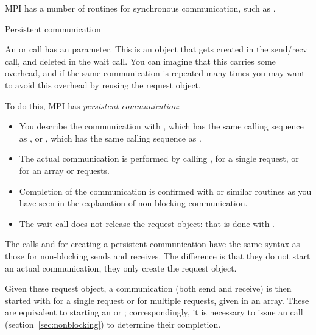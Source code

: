 MPI has a number of routines for synchronous communication,
such as .



 {Persistent communication}
\label{sec:persistent}

An  or  call has an
 parameter.  This is an object that gets
created in the send/recv call, and deleted in the wait call. You can
imagine that this carries some overhead, and if the same communication
is repeated many times you may want to avoid this overhead by reusing
the request object.

To do this, MPI has \emph{persistent communication}:
\begin{itemize}
\item You describe the communication with
  , which has the same calling sequence as
  , or , which has the same
  calling sequence as .
\item The actual communication is performed by calling
  , for a single request, or
   for an array or requests.
\item Completion of the communication is confirmed with
   or similar routines as you have seen in the
  explanation of non-blocking communication.
\item The wait call does not release the request object: that is done
  with .
\end{itemize}

The calls  and 
for creating a persistent communication have the same syntax as 
those for non-blocking sends and receives. The difference is that they do not start
an actual communication, they only create the request object.
%
%
%

Given these request object, a communication (both send and receive) is then started
with  for a single request or  for 
multiple requests, given in an array.
%
%
%
These are equivalent to starting an  or
; correspondingly, it is necessary to issue an
 call (section~\ref{sec:nonblocking}) to
determine their completion.

